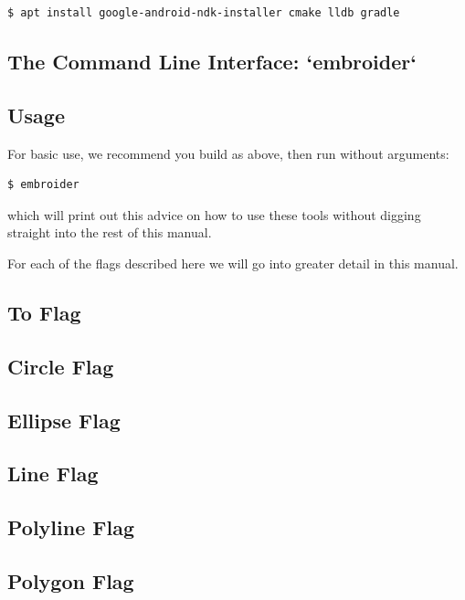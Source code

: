 \documentclass[a4paper]{report}
\begin{document}
\begin{lstlisting}
$ apt install google-android-ndk-installer cmake lldb gradle
\end{lstlisting}

\subsection{The Command Line Interface: `embroider`}

\subsection{Usage}

For basic use, we recommend you build as above, then run without arguments:

\begin{lstlisting}
$ embroider
\end{lstlisting}

which will print out this advice on how to use these tools without digging straight into the rest of this manual.


For each of the flags described here we will go into greater detail in this manual.

\subsection{To Flag}

\subsection{Circle Flag}

\subsection{Ellipse Flag}

\subsection{Line Flag}

\subsection{Polyline Flag}

\subsection{Polygon Flag}
\end{document}
